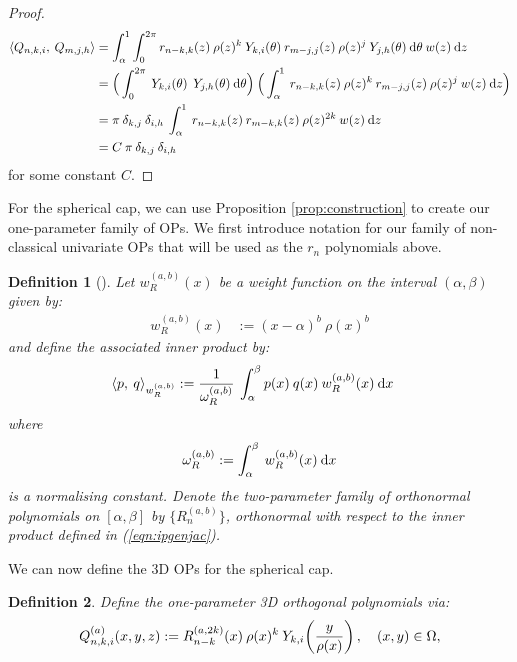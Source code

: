 \documentclass[11pt, oneside]{article}   	%
\newcommand{\genjac}{R}
\newcommand{\genjacnmk}{\genjac_{n-k}}
\newcommand{\genjacw}{w_\genjac}
\newcommand{\normgenjac}{\omega_\genjac}
\newcommand{\scop}{Q}
\newcommand{\scopnki}{\scop_{n,k,i}}
\newcommand{\scopmjh}{\scop_{m,j,h}}
\newcommand{\scopnkia}{\scopnki^{(a)}}
\newcommand{\ch}{Y}
\newcommand{\chki}{\ch_{k,i}}
\newtheorem{definition}{Definition}
\begin{document}
\begin{proof}
\begin{align*}
	\ip< \scopnki, \: \scopmjh > &= \int_\alpha^1 \int_0^{2\pi} r_{n-k,k}(z) \: \rho(z)^k \: \ch_{k,i}(\theta) \: r_{m-j,j}(z) \: \rho(z)^j \: \ch_{j,h}(\theta) \: \D \theta \: w(z) \: \D z \\
	&= \Big(\int_0^{2\pi}  \: \ch_{k,i}(\theta) \: \: \ch_{j,h}(\theta) \: \D \theta \Big) \: \Big( \int_\alpha^1 \: r_{n-k,k}(z) \: \rho(z)^k \: r_{m-j,j}(z) \: \rho(z)^j \: w(z) \: \D z \Big) \\
	&= \pi \: \delta_{k,j} \: \delta_{i,h} \:  \int_\alpha^1 \: r_{n-k,k}(z) \: r_{m-k,k}(z) \: \rho(z)^{2k} \: w(z) \: \D z \\
	&= C \: \pi \: \delta_{k,j} \: \delta_{i,h}
\end{align*}
for some constant $C$.
\end{proof}

For the spherical cap, we can use Proposition \ref{prop:construction} to create our one-parameter family of OPs. We first introduce notation for our family of non-classical univariate OPs that will be used as the $r_n$ polynomials above.
\begin{definition}[\cite{snowball2019sparse}]\label{def:OPconstruction}
Let $\genjacw^{(a,b)}(x)$ be a weight function on the interval $(\alpha, \beta)$ given by:
\begin{align*}
	\genjacw^{(a,b)}(x) &:= (x - \alpha)^{b} \: \rho(x)^{b}
\end{align*}
and define the associated inner product by:
\begin{align}
	\ip< p, \: q >_{\genjacw^{(a,b)}} &:= \frac{1}{\normgenjac^{(a,b)}} \: \int_\alpha^\beta p(x) \: q(x) \: \genjacw^{(a,b)}(x) \: \D x \label{eqn:ipgenjac}
\end{align}
where
\begin{align}
	\normgenjac^{(a,b)} := \int_\alpha^\beta \: \genjacw^{(a,b)}(x) \: \D x \label{eqn:ipnormalisation}
\end{align}
is a normalising constant.
Denote the two-parameter family of orthonormal polynomials on $[\alpha,\beta]$ by $\{\genjac_n^{(a,b)}\}$, orthonormal with respect to the inner product defined in (\ref{eqn:ipgenjac}).
\end{definition}

We can now define the 3D OPs for the spherical cap.
\begin{definition}\label{def:constuction}
Define the one-parameter 3D orthogonal polynomials via:
\begin{align}
	\scopnkia(x,y,z) := \genjacnmk^{(a,2k)}(x) \: \rho(x)^k \: \chki\fpr(\frac{y}{\rho(x)}), \quad (x,y) \in \Omega, 
\end{align}
\end{definition}
\end{document}
